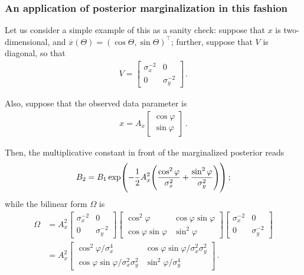 \documentclass[main.tex]{subfiles}
\begin{document}
\subsubsection{An application of posterior marginalization in this fashion}

Let us consider a simple example of this as a sanity check: suppose that \(x\) is two-dimensional, and \(\overline{x}(\Theta ) = (\cos \Theta , \sin \Theta )^{\top}\); further, suppose that \(V\) is diagonal, so that 
%
\begin{align}
V = \left[\begin{array}{cc}
\sigma_x^{-2} & 0 \\ 
0 & \sigma _y^{-2}
\end{array}\right]
\,.
\end{align}

Also, suppose that the observed data parameter is 
%
\begin{align}
x = A_x \left[\begin{array}{c}
\cos \varphi  \\ 
\sin \varphi 
\end{array}\right]
\,.
\end{align}

Then, the multiplicative constant in front of the marginalized posterior reads 
%
\begin{align}
B_2 = B_1 \exp(- \frac{1}{2} A_x^2 \qty( \frac{\cos^2\varphi}{\sigma^2_x} + \frac{\sin^2\varphi}{\sigma^2_y}))
\,;
\end{align}
%
while the bilinear form \(\Omega \) is 
%
\begin{align}
\Omega &= A_x^2
\left[\begin{array}{cc}
\sigma_x^{-2} & 0 \\ 
0 & \sigma _y^{-2}
\end{array}\right]
\left[\begin{array}{cc}
\cos^2 \varphi  & \cos \varphi \sin \varphi  \\ 
\cos \varphi \sin \varphi  & \sin^2 \varphi 
\end{array}\right]
\left[\begin{array}{cc}
\sigma_x^{-2} & 0 \\ 
0 & \sigma _y^{-2}
\end{array}\right]  \\
&= A_x^2\left[\begin{array}{cc}
\cos^2 \varphi / \sigma_x^{4} & \cos \varphi \sin \varphi / \sigma_x^2 \sigma _y^2 \\ 
\cos \varphi \sin \varphi / \sigma_x^2 \sigma _y^2 & \sin^2 \varphi / \sigma_y^{4}
\end{array}\right]
\,.
\end{align}
\end{document}
